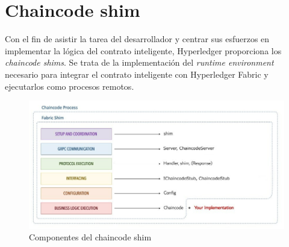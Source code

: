 %

\section{Chaincode shim} \label{chaincodeshim}

Con el fin de asistir la tarea del desarrollador y centrar sus esfuerzos en implementar la lógica del contrato inteligente, Hyperledger proporciona los \textit{chaincode shims}. Se trata de la implementación del \textit{runtime environment} necesario para integrar el contrato inteligente con Hyperledger Fabric y ejecutarlos como procesos remotos.


\begin{figure}[tbph]
\centering
\includegraphics[width=\textwidth]{Images/chaincode_shim}
\caption{Componentes del chaincode shim}
\label{fig:chaincodeshim}
\end{figure}

